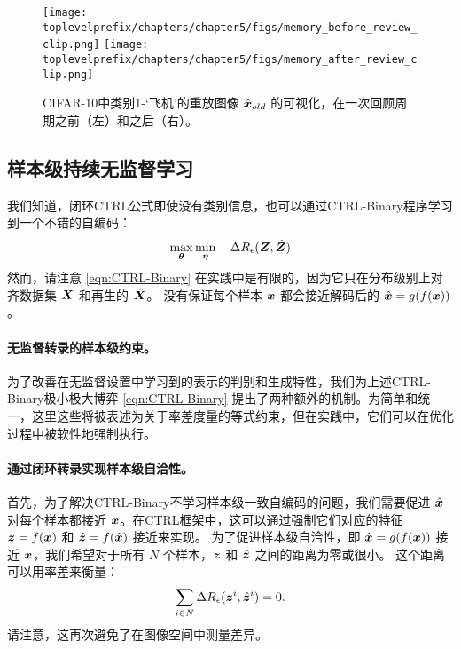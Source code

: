 \documentclass[../../book-main.tex]{subfiles}
\begin{document}
\begin{figure}
\centering
\texttt{[image: \\toplevelprefix/chapters/chapter5/figs/memory\_before\_review\_clip.png]}
\texttt{[image: \\toplevelprefix/chapters/chapter5/figs/memory\_after\_review\_clip.png]}
 \caption{\small CIFAR-10中类别1-‘飞机’的重放图像 $\hat{\bm{x}}_{old}$ 的可视化，在一次回顾周期之前（左）和之后（右）。} 
\label{fig:memory_review}
\end{figure}


\subsection{样本级持续无监督学习}
\label{sec:sample-wise-incremental}

我们知道，闭环CTRL公式即使没有类别信息，也可以通过CTRL-Binary程序学习到一个不错的自编码：
\begin{align}
      \max_{\bm \theta} \min_{\bm \eta} \quad \Delta R_\epsilon(\bm{Z}, \hat{\bm{Z}}) 
 \label{eqn:CTRL-Binary}
\end{align}
然而，请注意 \eqref{eqn:CTRL-Binary} 在实践中是有限的，因为它只在分布级别上对齐数据集 $\bm{X}$ 和再生的 $\hat {\bm{X}}$。
没有保证每个样本 $\bm{x}$ 都会接近解码后的 $\hat {\bm{x}} = g(f(\bm{x}))$。

\paragraph{无监督转录的样本级约束。} 
\label{sec:constraints}
为了改善在无监督设置中学习到的表示的判别和生成特性，我们为上述CTRL-Binary极小极大博弈 \eqref{eqn:CTRL-Binary} 提出了两种额外的机制。为简单和统一，这里这些将被表述为关于率差度量的等式约束，但在实践中，它们可以在优化过程中被软性地强制执行。

\paragraph{通过闭环转录实现样本级自洽性。} 
首先，为了解决CTRL-Binary不学习样本级一致自编码的问题，我们需要促进 $\hat {\bm{x}}$ 对每个样本都接近 $\bm{x}$。在CTRL框架中，这可以通过强制它们对应的特征 $\bm{z}=f(\bm{x})$ 和 $\hat {\bm{z}} = f(\hat {\bm{x}})$ 接近来实现。
为了促进样本级自洽性，即 $\hat{\bm{x}} = g(f(\bm{x}))$ 接近 $\bm{x}$，我们希望对于所有 $N$ 个样本，$\bm{z}$ 和 $\hat{\bm{z}}$ 之间的距离为零或很小。
这个距离可以用率差来衡量：
\begin{align}
\sum_{i\in N} \Delta R_\epsilon(\z^i,\hat{\z}^i) = 0.
\label{eqn:sample-self-consistency}\vspace{-2mm}
\end{align}
请注意，这再次避免了在图像空间中测量差异。
\end{document}
